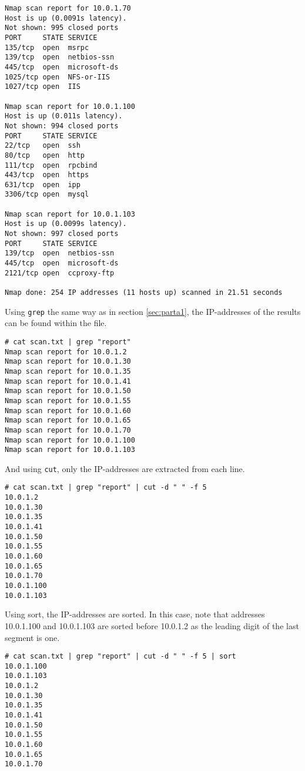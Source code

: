 \begin{lstlisting}[numbers=none, language={}, frame=single, framexleftmargin={0.2em}]
Nmap scan report for 10.0.1.70
Host is up (0.0091s latency).
Not shown: 995 closed ports
PORT     STATE SERVICE
135/tcp  open  msrpc
139/tcp  open  netbios-ssn
445/tcp  open  microsoft-ds
1025/tcp open  NFS-or-IIS
1027/tcp open  IIS

Nmap scan report for 10.0.1.100
Host is up (0.011s latency).
Not shown: 994 closed ports
PORT     STATE SERVICE
22/tcp   open  ssh
80/tcp   open  http
111/tcp  open  rpcbind
443/tcp  open  https
631/tcp  open  ipp
3306/tcp open  mysql

Nmap scan report for 10.0.1.103
Host is up (0.0099s latency).
Not shown: 997 closed ports
PORT     STATE SERVICE
139/tcp  open  netbios-ssn
445/tcp  open  microsoft-ds
2121/tcp open  ccproxy-ftp

Nmap done: 254 IP addresses (11 hosts up) scanned in 21.51 seconds
\end{lstlisting}

Using \texttt{grep} the same way as in section \ref{sec:parta1}, the
IP-addresses of the results can be found within the file.

\begin{lstlisting}[numbers=none, language={}, frame=single, framexleftmargin={0.2em}]
# cat scan.txt | grep "report"
Nmap scan report for 10.0.1.2
Nmap scan report for 10.0.1.30
Nmap scan report for 10.0.1.35
Nmap scan report for 10.0.1.41
Nmap scan report for 10.0.1.50
Nmap scan report for 10.0.1.55
Nmap scan report for 10.0.1.60
Nmap scan report for 10.0.1.65
Nmap scan report for 10.0.1.70
Nmap scan report for 10.0.1.100
Nmap scan report for 10.0.1.103
\end{lstlisting}

And using \texttt{cut}, only the IP-addresses are extracted from each
line.

\begin{lstlisting}[numbers=none, language={}, frame=single, framexleftmargin={0.2em}]
# cat scan.txt | grep "report" | cut -d " " -f 5
10.0.1.2
10.0.1.30
10.0.1.35
10.0.1.41
10.0.1.50
10.0.1.55
10.0.1.60
10.0.1.65
10.0.1.70
10.0.1.100
10.0.1.103
\end{lstlisting}

Using sort, the IP-addresses are sorted. In this case, note that
addresses 10.0.1.100 and 10.0.1.103 are sorted before 10.0.1.2 as
the leading digit of the last segment is one.

\begin{lstlisting}[numbers=none, language={}, frame=single, framexleftmargin={0.2em}]
# cat scan.txt | grep "report" | cut -d " " -f 5 | sort
10.0.1.100
10.0.1.103
10.0.1.2
10.0.1.30
10.0.1.35
10.0.1.41
10.0.1.50
10.0.1.55
10.0.1.60
10.0.1.65
10.0.1.70
\end{lstlisting}

